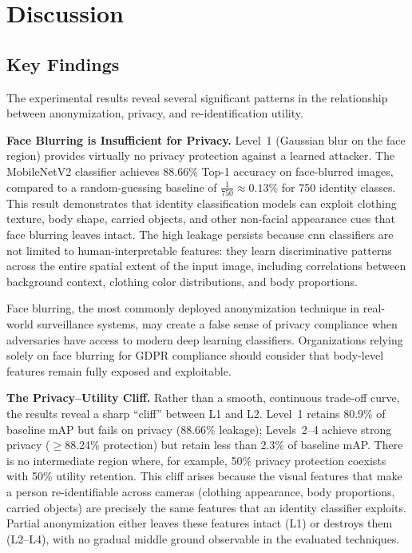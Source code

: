 \chapter{Discussion}

\section{Key Findings}

The experimental results reveal several significant patterns in the relationship between anonymization, privacy, and re-identification utility.

\textbf{Face Blurring is Insufficient for Privacy.}
Level~1 (Gaussian blur on the face region) provides virtually no privacy protection against a learned attacker. The MobileNetV2 classifier achieves 88.66\% Top-1 accuracy on face-blurred images, compared to a random-guessing baseline of $\frac{1}{750} \approx 0.13\%$ for 750 identity classes. This result demonstrates that identity classification models can exploit clothing texture, body shape, carried objects, and other non-facial appearance cues that face blurring leaves intact. The high leakage persists because \acrshort{cnn} classifiers are not limited to human-interpretable features: they learn discriminative patterns across the entire spatial extent of the input image, including correlations between background context, clothing color distributions, and body proportions.

\begin{keybox}
Face blurring, the most commonly deployed anonymization technique in real-world surveillance systems, may create a false sense of privacy compliance when adversaries have access to modern deep learning classifiers. Organizations relying solely on face blurring for GDPR compliance should consider that body-level features remain fully exposed and exploitable.
\end{keybox}

\textbf{The Privacy--Utility Cliff.}
Rather than a smooth, continuous trade-off curve, the results reveal a sharp ``cliff'' between L1 and L2. Level~1 retains 80.9\% of baseline mAP but fails on privacy (88.66\% leakage); Levels~2--4 achieve strong privacy ($\geq$88.24\% protection) but retain less than 2.3\% of baseline mAP. There is no intermediate region where, for example, 50\% privacy protection coexists with 50\% utility retention. This cliff arises because the visual features that make a person re-identifiable across cameras (clothing appearance, body proportions, carried objects) are precisely the same features that an identity classifier exploits. Partial anonymization either leaves these features intact (L1) or destroys them (L2--L4), with no gradual middle ground observable in the evaluated techniques.

